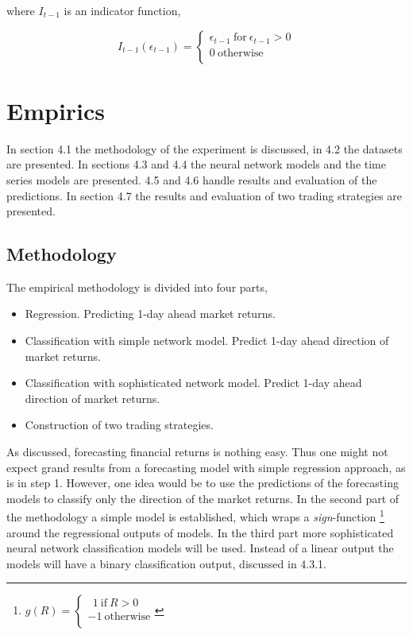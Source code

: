 \documentclass[12pt, letterpaper]{amsart}%
\begin{document}
where $I_{t-1}$ is an indicator function,

\begin{equation}
I_{t-1}(\epsilon_{t-1}) = 
     \begin{cases}
       \epsilon_{t-1} \ \text{for} \ \epsilon_{t-1} > 0 \\
       0 \ \text{otherwise} \\ 
     \end{cases}
\end{equation}


\section{Empirics}
In section 4.1 the methodology of the experiment is discussed, in 4.2 the datasets are presented. In sections 4.3 and 4.4 the neural network models and the time series models are presented. 4.5 and 4.6 handle results and evaluation of the predictions. In section 4.7 the results and evaluation of two trading strategies are presented.

\subsection{Methodology}
The empirical methodology is divided into four parts,
\\

\begin{itemize}  
\item Regression. Predicting 1-day ahead market returns.
\item Classification with simple network model. Predict 1-day ahead direction of market returns.
\item Classification with sophisticated network model. Predict 1-day ahead direction of market returns.
\item Construction of two trading strategies.
\end{itemize}
\vspace{0.5cm}

As discussed, forecasting financial returns is nothing easy. Thus one might not expect grand results from a forecasting model with simple regression approach, as is in step 1. However, one idea would be to use the predictions of the forecasting models to classify only the direction of the market returns. In the second part of the methodology a simple model is established, which wraps a \textit{sign}-function \footnote{$g(R) = 
     \begin{cases}
       \ \ 1 \ \text{if} \ R > 0 \\
       -1 \ \text{otherwise} \\ 
     \end{cases}$} around the regressional outputs of models. In the third part more sophisticated neural network classification models will be used. Instead of a linear output the models will have a binary classification output, discussed in 4.3.1.
\\
\end{document}

